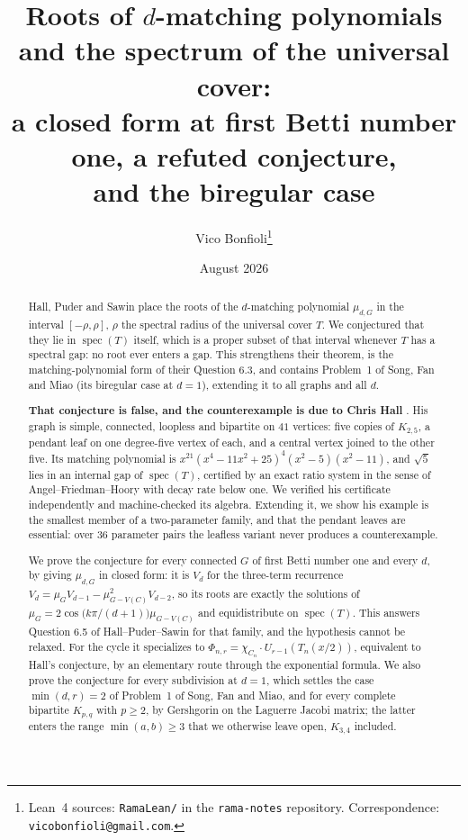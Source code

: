 \documentclass[11pt]{article}
\title{Roots of $d$-matching polynomials and the spectrum of the universal cover:\\
a closed form at first Betti number one, a refuted conjecture,\\
and the biregular case}
\author{Vico Bonfioli\thanks{Lean~4 sources: \texttt{RamaLean/} in the \texttt{rama-notes} repository. Correspondence: \texttt{vicobonfioli@gmail.com}.}}
\date{August 2026}
\theoremstyle{remark}
\begin{document}
\maketitle

\begin{abstract}
Hall, Puder and Sawin place the roots of the $d$-matching polynomial $\mu_{d,G}$ in
the interval $[-\rho,\rho]$, $\rho$ the spectral radius of the universal cover $T$.
We conjectured that they lie in $\operatorname{spec}(T)$ itself, which is a proper
subset of that interval whenever $T$ has a spectral gap: no root ever enters a gap.
This strengthens their theorem, is the matching-polynomial form of their Question
6.3, and contains Problem~1 of Song, Fan and Miao (its biregular case at $d=1$), extending it to
all graphs and all $d$.

\textbf{That conjecture is false, and the counterexample is due to Chris Hall}
\cite{HallCE}. His graph is simple, connected, loopless and bipartite on $41$ vertices:
five copies of $K_{2,5}$, a pendant leaf on one degree-five vertex of each, and a central
vertex joined to the other five. Its matching polynomial is
$x^{21}(x^4-11x^2+25)^4(x^2-5)(x^2-11)$, and $\sqrt5$ lies in an internal gap of
$\operatorname{spec}(T)$, certified by an exact ratio system in the sense of
Angel--Friedman--Hoory \cite{AFH} with decay rate below one. We verified his certificate
independently and machine-checked its algebra. Extending it, we show his example is the
smallest member of a two-parameter family, and that the pendant leaves are essential: over
$36$ parameter pairs the leafless variant never produces a counterexample.

We prove the conjecture for every connected $G$ of first Betti number one and every
$d$, by giving $\mu_{d,G}$ in closed form: it is $V_d$ for the three-term recurrence
$V_d=\mu_GV_{d-1}-\mu_{G-V(C)}^2V_{d-2}$, so its roots are exactly the solutions of
$\mu_G=2\cos\bigl(k\pi/(d+1)\bigr)\mu_{G-V(C)}$ and equidistribute on
$\operatorname{spec}(T)$. This answers Question 6.5 of Hall--Puder--Sawin for that
family, and the hypothesis cannot be relaxed. For the cycle it specializes to
$\Phi_{n,r}=\chi_{C_n}\cdot U_{r-1}(T_n(x/2))$, equivalent to Hall's conjecture, by
an elementary route through the exponential formula. We also prove the conjecture
for every subdivision at $d=1$, which settles the case $\min(d,r)=2$ of Problem~1 of
Song, Fan and Miao, and for every complete bipartite $K_{p,q}$ with $p\ge2$, by
Gershgorin on the Laguerre Jacobi matrix; the latter enters the range
$\min(a,b)\ge3$ that we otherwise leave open, $K_{3,4}$ included.


\end{abstract}
\end{document}
